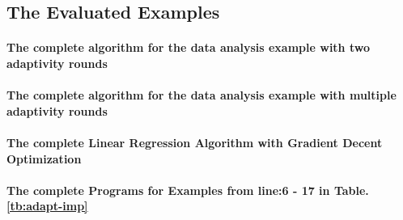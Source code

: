  \subsection{The Evaluated Examples}  
 \paragraph{The complete algorithm for the data analysis example with two adaptivity rounds} 
 

 \paragraph{The complete algorithm for the data analysis example with multiple adaptivity rounds} 
 
\paragraph{The complete Linear Regression Algorithm with Gradient Decent Optimization}

                  
\paragraph*{The complete Programs for Examples from line:6 - 17 in Table.\ref{tb:adapt-imp}}
